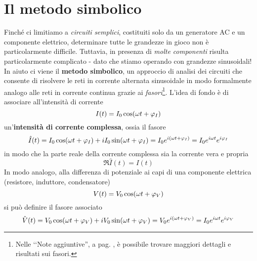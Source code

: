 \section{Il metodo simbolico}
Finché ci limitiamo a \textit{circuiti semplici}, costituiti solo da un generatore AC e un componente elettrico, determinare tutte le grandezze in gioco non è particolarmente difficile. Tuttavia, in presenza di \textit{molte componenti} risulta particolarmente complicato - dato che stiamo operando con grandezze sinusoidali!\\
In aiuto ci viene il \textbf{metodo simbolico}, un approccio di analisi dei circuiti che consente di risolvere le reti in corrente alternata sinusoidale in modo formalmente analogo alle reti in corrente continua grazie ai \textit{fasori}\footnote{Nelle ‘‘Note aggiuntive'', a pag. \pageref{fasori}, è possibile trovare maggiori dettagli e risultati sui fasori.}. L'idea di fondo è di associare all'intensità di corrente
\begin{equation}
	I(t)=I_0\cos(\omega t+\oldphi_I)
\end{equation}
un'\textbf{intensità di corrente complessa}, ossia il fasore
\begin{equation}
	\hat{I}(t)=I_0\cos(\omega t+\oldphi_I)+iI_0\sin(\omega t+\oldphi_I)=I_0e^{i(\omega t+\oldphi_I)}=I_0e^{i\omega t}e^{i\oldphi_I}
\end{equation}
in modo che la parte reale della corrente complessa sia la corrente vera e propria
\begin{equation}
	\Re{\hat{I}(t)}=I(t)
\end{equation}
In modo analogo, alla differenza di potenziale ai capi di una componente elettrica (resistore, induttore, condensatore)
\begin{equation}
	V(t)=V_0\cos(\omega t+\oldphi_V)
\end{equation}
si può definire il fasore associato
\begin{equation}
	\hat{V}(t)=V_0\cos(\omega t+\oldphi_V)+iV_0\sin(\omega t+\oldphi_V)=V_0e^{i(\omega t+\oldphi_V)}=I_0e^{i\omega t}e^{i\oldphi_V}
\end{equation}
